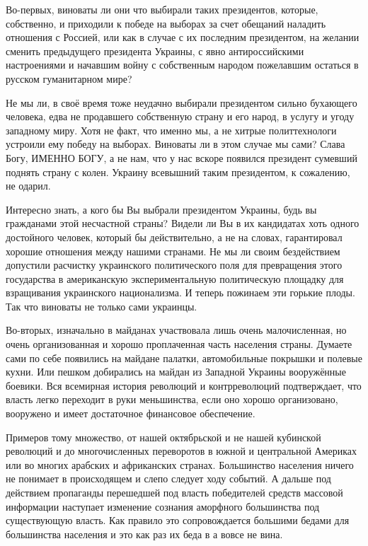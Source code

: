 Во-первых, виноваты ли они что выбирали таких президентов, которые, собственно,
и приходили к победе на выборах за счет обещаний наладить отношения с Россией,
или как в случае с их последним президентом, на желании сменить предыдущего
президента Украины, с явно антироссийскими настроениями и начавшим войну с
собственным народом пожелавшим остаться в русском гуманитарном мире?

Не мы ли, в своё время тоже неудачно выбирали президентом сильно бухающего
человека, едва не продавшего собственную страну и его народ, в услугу и угоду
западному миру. Хотя не факт, что именно мы, а не хитрые политтехнологи
устроили ему победу на выборах. Виноваты ли в этом случае мы сами? Слава Богу,
ИМЕННО БОГУ, а не нам, что у нас вскоре появился президент сумевший поднять
страну с колен. Украину всевышний таким президентом, к сожалению, не одарил.

Интересно знать, а кого бы Вы выбрали президентом Украины, будь вы гражданами
этой несчастной страны? Видели ли Вы в их кандидатах хоть одного достойного
человек, который бы действительно, а не на словах, гарантировал хорошие
отношения между нашими странами. Не мы ли своим бездействием допустили
расчистку украинского политического поля для превращения этого государства в
американскую экспериментальную политическую площадку для взращивания
украинского национализма. И теперь пожинаем эти горькие плоды. Так что виноваты
не только сами украинцы.


Во-вторых, изначально в майданах участвовала лишь очень малочисленная, но очень
организованная и хорошо проплаченная часть населения страны. Думаете сами по
себе появились на майдане палатки, автомобильные покрышки и полевые кухни. Или
пешком добирались на майдан из Западной Украины вооружённые боевики. Вся
всемирная история революций и контрреволюций подтверждает, что власть легко
переходит в руки меньшинства, если оно хорошо организовано, вооружено и имеет
достаточное финансовое обеспечение.

Примеров тому множество, от нашей октябрьской и не нашей кубинской революций и
до многочисленных переворотов в южной и центральной Америках или во многих
арабских и африканских странах. Большинство населения ничего не понимает в
происходящем и слепо следует ходу событий. А дальше под действием пропаганды
перешедшей под власть победителей средств массовой информации наступает
изменение сознания аморфного большинства под существующую власть. Как правило
это сопровождается большими бедами для большинства населения и это как раз их
беда в а вовсе не вина.

